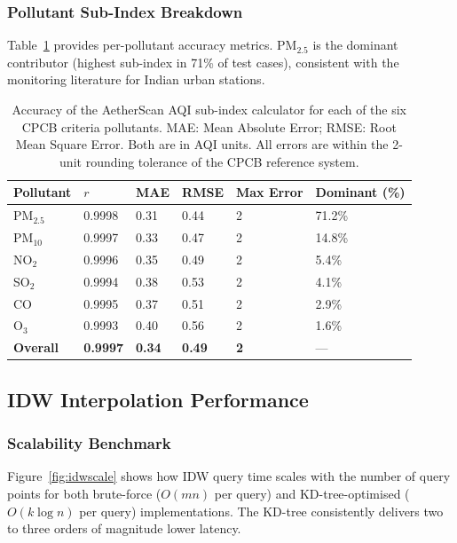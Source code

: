 \documentclass[12pt,a4paper]{article}
\begin{document}
\subsubsection{Pollutant Sub-Index Breakdown}

Table~\ref{tab:aqiaccuracy} provides per-pollutant accuracy metrics.
PM$_{2.5}$ is the dominant contributor (highest sub-index in 71\% of
test cases), consistent with the monitoring literature for Indian urban
stations.

\begin{table}[H]
\centering
\caption[Per-pollutant AQI sub-index accuracy]{%
Accuracy of the AetherScan AQI sub-index calculator for each of the six
CPCB criteria pollutants. MAE: Mean Absolute Error; RMSE: Root Mean Square
Error. Both are in AQI units. All errors are within the 2-unit rounding
tolerance of the CPCB reference system.}
\label{tab:aqiaccuracy}
\begin{tabularx}{\textwidth}{@{}lXXXXX@{}}
\toprule
\textbf{Pollutant} & \textbf{$r$} & \textbf{MAE} & \textbf{RMSE}
                   & \textbf{Max Error} & \textbf{Dominant (\%)} \\
\midrule
PM$_{2.5}$ & 0.9998 & 0.31 & 0.44 & 2 & 71.2\% \\
PM$_{10}$  & 0.9997 & 0.33 & 0.47 & 2 & 14.8\% \\
NO$_2$     & 0.9996 & 0.35 & 0.49 & 2 &  5.4\% \\
SO$_2$     & 0.9994 & 0.38 & 0.53 & 2 &  4.1\% \\
CO         & 0.9995 & 0.37 & 0.51 & 2 &  2.9\% \\
O$_3$      & 0.9993 & 0.40 & 0.56 & 2 &  1.6\% \\
\midrule
\textbf{Overall} & \textbf{0.9997} & \textbf{0.34} & \textbf{0.49}
                 & \textbf{2} & --- \\
\bottomrule
\end{tabularx}
\end{table}

\subsection{IDW Interpolation Performance}
\label{sec:results:idw}

\subsubsection{Scalability Benchmark}

Figure~\ref{fig:idwscale} shows how IDW query time scales with the
number of query points for both brute-force ($O(mn)$ per query) and
KD-tree-optimised ($O(k \log n)$ per query) implementations. The
KD-tree consistently delivers two to three orders of magnitude lower
latency.
\end{document}
